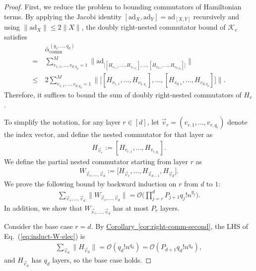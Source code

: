 \documentclass[aps,pra,reprint,groupedaddress,floatfix]{revtex4-2}
\newcommand{\eq}[1]{(\ref{eq:#1})}
\newcommand{\cor}[1]{\hyperref[cor:#1]{Corollary~\ref*{cor:#1}}}
\newcommand{\ad}{\mathrm{ad}}
\renewcommand{\comm}{\mathrm{comm}}
\newcommand{\mc}{\mathcal}
\begin{document}
\begin{proof}
    First, we reduce the problem to bounding commutators of Hamiltonian terms. By applying the Jacobi identity $[\ad_{X}, \ad_Y] = \ad_{[X,Y]}$ recursively and using $\|\ad_X\| \le 2\|X\|$, the doubly right-nested commutator bound of $\mc K_v$ satisfies
    \begin{align*}
    & \bar{\alpha}_{\comm}^{(q_1, \ldots, q_{d})}\\
    =~& \sum_{v_{1,1}, \ldots, v_{d, q_{d}} = 1}^M \bigg\| \ad_{\Big[ 
         [H_{v_{1,1}}, \ldots, H_{v_{1,q_1}}], \ldots, 
        [H_{v_{d,1}}, \ldots, H_{v_{d,q_{d}}}]
     \Big]} \bigg\|\\
     \le~& 2\sum_{v_{1,1}, \ldots, v_{d, q_{d}} = 1}^M \bigg\|{\Big[ 
         [H_{v_{1,1}}, \ldots, H_{v_{1,q_1}}], \ldots, 
        [H_{v_{d,1}}, \ldots, H_{v_{d,q_{d}}}]
     \Big]} \bigg\|.
    \end{align*}
    Therefore, it suffices to bound the sum of doubly right-nested commutators of $H_v$. 
    
    To simplify the notation, for any layer $r \in [d]$, let $\vec{v}_r = (v_{r,1}, \ldots, v_{r, q_r})$ denote the index vector, and define the nested commutator for that layer as
    \begin{align*}
        H_{\vec{v}_r} := [H_{v_{r,1}}, \ldots, H_{v_{r, q_r}}].
    \end{align*}
    We define the partial nested commutator starting from layer $r$ as
    \begin{align*}
        W_{\vec{v}_{r}, \ldots, \vec{v}_d} := \Big[ H_{\vec{v}_r}, \ldots, H_{\vec{v}_{d-1}}, H_{\vec{v}_d} \Big].
    \end{align*}
    We prove the following bound by backward induction on $r$ from $d$ to $1$:
    \begin{align} \label{eq:induct-W-elec}
        \sum_{\vec{v}_{r}, \ldots, \vec{v}_{d}} \Big\|W_{\vec{v}_{r}, \ldots, \vec{v}_d}\Big\| = \mathcal{O}\bigg(\prod_{j=r}^{d}P_{j+1} q_j! n^{q_j}\bigg).
    \end{align} In addition, we show that $W_{\vec{v}_{r}, \ldots, \vec{v}_d}$ has at most $P_r$ layers.  
    
    Consider the base case $r=d$. By \cor{right-comm-second}, the LHS of Eq.~\eq{induct-W-elec} is \begin{align*}
        \sum_{\vec{v}_d} \|H_{\vec{v}_d}\| = \mc{O}(q_d ! n^{q_d}) = \mc{O}(P_{d+1}q_d ! n^{q_d}),
    \end{align*} and $H_{\vec{v}_d}$ has $q_d$ layers, so the base case holds. 


\end{proof}
\end{document}
